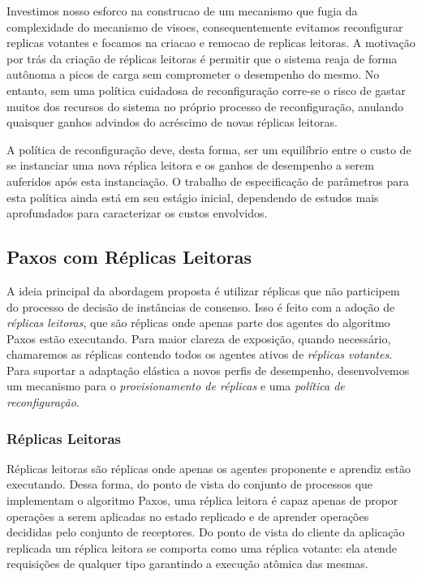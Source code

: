 Investimos nosso esforco na construcao de um mecanismo que fugia da complexidade do
mecanismo de visoes, consequentemente evitamos reconfigurar replicas votantes e focamos na
criacao e remocao de replicas leitoras. A  motivação por trás da criação de réplicas
leitoras é permitir que o sistema reaja de forma autônoma a picos de carga sem comprometer
o desempenho do mesmo. No entanto, sem uma política cuidadosa de reconfiguração corre-se o
risco de gastar muitos dos recursos do sistema no próprio processo de reconfiguração,
anulando quaisquer ganhos advindos do acréscimo de novas réplicas leitoras.

A política de reconfiguração deve, desta forma, ser um equilíbrio entre o custo de se
instanciar uma nova réplica leitora e os ganhos de desempenho a serem auferidos após esta
instanciação. O trabalho de especificação de parâmetros para esta política ainda está em
seu estágio inicial, dependendo de estudos mais aprofundados para caracterizar os custos
envolvidos.

\subsection{Paxos com Réplicas Leitoras}\label{sec:replicas_leitoras}

A ideia principal da abordagem proposta é utilizar réplicas que não participem do processo
de decisão de instâncias de consenso. Isso é feito com a adoção de \emph{réplicas
leitoras}, que são réplicas onde apenas parte dos agentes do algoritmo Paxos estão
executando. Para maior clareza de exposição, quando necessário, chamaremos as réplicas
contendo todos os agentes ativos de \emph{réplicas votantes}. Para suportar a adaptação
elástica a novos perfis de desempenho, desenvolvemos um mecanismo para o
\emph{provisionamento de réplicas} e uma \emph{política de reconfiguração}.

\subsubsection{Réplicas Leitoras}

Réplicas leitoras são réplicas onde apenas os agentes proponente e aprendiz estão
executando. Dessa forma, do ponto de vista do conjunto de processos que implementam o
algoritmo Paxos, uma réplica leitora é capaz apenas de propor operações a serem aplicadas
no estado replicado e de aprender operações decididas pelo conjunto de receptores. Do
ponto de vista do cliente da aplicação replicada um réplica leitora se comporta como uma
réplica votante: ela atende requisições de qualquer tipo garantindo a execução atômica das
mesmas.

